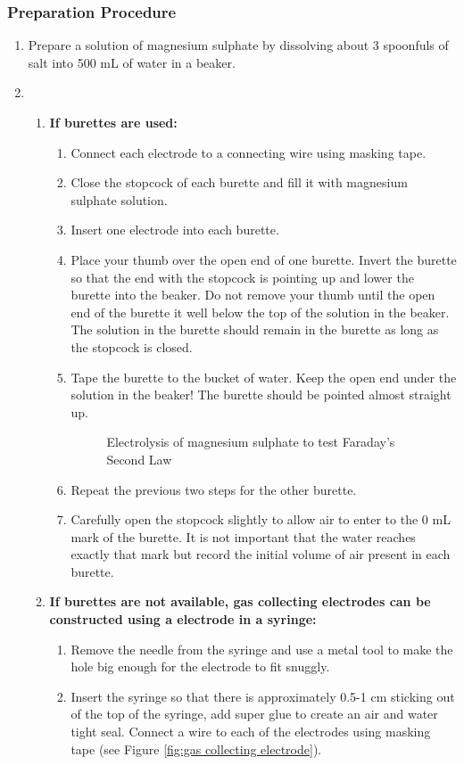 \subsubsection*{Preparation Procedure}
\begin{enumerate}
\item{Prepare a solution of magnesium sulphate by dissolving about 3 spoonfuls of salt into 500 mL of water in a beaker.}
\item{}
\begin{enumerate}
\item{\textbf{If burettes are used:}}
\begin{enumerate}
\item{Connect each electrode to a connecting wire using masking tape.}
\item{Close the stopcock of each burette and fill it with magnesium sulphate solution.} 
\item{Insert one electrode into each burette.}
\item{Place your thumb over the open end of one burette. Invert the burette so that the end with the stopcock is pointing up and lower the burette into the beaker. Do not remove your thumb until the open end of the burette it well below the top of the solution in the beaker. The solution in the burette should remain in the burette as long as the stopcock is closed.}
\item{Tape the burette to the bucket of water. Keep the open end under the solution in the beaker! The burette should be pointed almost straight up.}
\begin{center}
\begin{figure}[h!]

\def\svgwidth{350pt}

\caption{Electrolysis of magnesium sulphate to test Faraday's Second Law}
\label{faraday-1}

\end{figure}
\end{center}
\item{Repeat the previous two steps for the other burette.}
\item{Carefully open the stopcock slightly to allow air to enter to the 0 mL mark of the burette. It is not important that the water reaches exactly that mark but record the initial volume of air present in each burette.}
\end{enumerate}
\item{\textbf{If burettes are not available, gas collecting electrodes can be constructed using a electrode in a syringe:}}
\begin{enumerate}
\item{Remove the needle from the syringe and use a metal tool to make the hole big enough for the electrode to fit snuggly.}
\item{Insert the syringe so that there is approximately 0.5-1 cm sticking out of the top of the syringe, add super glue to create an air and water tight seal. Connect a wire to each of the electrodes using masking tape (see Figure \ref{fig:gas collecting electrode}).

}
\end{enumerate}
\end{enumerate}
\end{enumerate}

